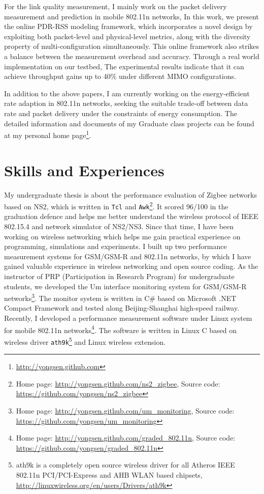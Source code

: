 \documentclass{article}
\begin{document}
For the link quality measurement, I mainly work on the packet delivery measurement and prediction in mobile 802.11n networks, In this work, we present the online PDR-RSS modeling framework, which incorporates a novel design by exploiting both packet-level and physical-level metrics, along with the diversity property of multi-configuration simultaneously. This online framework also strikes a balance between the measurement overhead and accuracy. Through a real world implementation on our testbed, The experimental results indicate that it can achieve throughput gains up to 40\% under different MIMO configurations.

In addition to the above papers, I am currently working on the energy-efficient rate adaption in 802.11n networks, seeking the suitable trade-off between data rate and packet delivery under the constraints of energy consumption. The detailed information and documents of my Graduate class projects can be found at my personal home page\footnote{\url{http://yongsen.github.com}}.

\section{Skills and Experiences}

My undergraduate thesis is about the performance evaluation of Zigbee networks based on NS2, which is written in \verb"Tcl" and \verb"Awk"\footnote{Home page: \url{http://yongsen.github.com/ns2_zigbee}, Source code: \url{https://github.com/yongsen/ns2_zigbee}}. It scored 96/100 in the graduation defence and helps me better understand the wireless protocol of IEEE 802.15.4 and network simulator of NS2/NS3. Since that time, I have been working on wireless networking which helps me gain practical experience on programming, simulations and experiments. I built up two performance measurement systems for GSM/GSM-R and 802.11n networks, by which I have gained valuable experience in wireless networking and open source coding. As the instructor of PRP (Participation in Research Program) for undergraduate students, we developed the Um interface monitoring system for GSM/GSM-R networks\footnote{Home page: \url{http://yongsen.github.com/um_monitoring}, Source code: \url{https://github.com/yongsen/um_monitoring}}. The monitor system is written in C\# based on Microsoft .NET Compact Framework and tested along Beijing-Shanghai high-speed railway. Recently, I developed a performance measurement software under Linux system for mobile 802.11n networks\footnote{Home page: \url{http://yongsen.github.com/graded_802.11n}, Source code: \url{https://github.com/yongsen/graded_802.11n}}. The software is written in Linux C based on wireless driver \texttt{ath9k}\footnote{ath9k is a completely open source wireless driver for all Atheros IEEE 802.11n PCI/PCI-Express and AHB WLAN based chipsets, \url{http://linuxwireless.org/en/users/Drivers/ath9k}} and Linux wireless extension.
\end{document}
